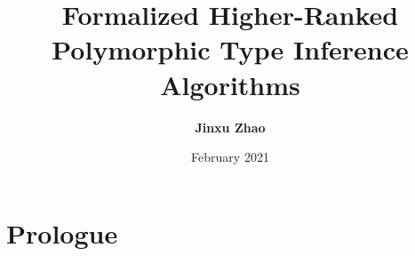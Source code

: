 



\title{Formalized Higher-Ranked Polymorphic Type Inference Algorithms}
\author{\textbf{Jinxu Zhao}}
\date{February 2021}




\maketitle

\begin{abstract}
 
\end{abstract}


\frontmatter
\makedeclaration
\makeAck
\tableofcontents
\listoffigures
\listoftables

\mainmatter

\part{Prologue}





%
%
%
%
%
%
%
%
%


\begin{comment}






\part{Related and Future Work}







\part{Epilogue}




\end{comment}

